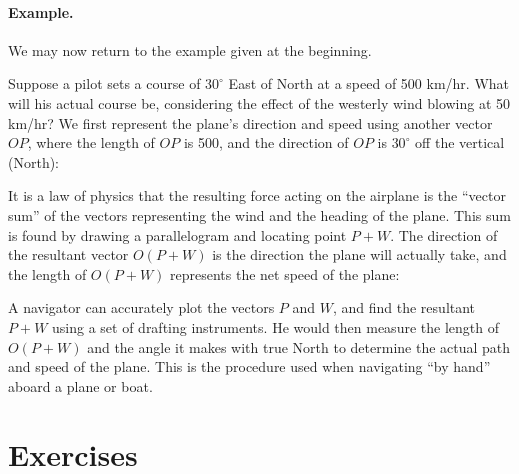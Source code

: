 \documentclass[12pt]{book} %
\begin{document}
\paragraph{Example.}
We may now return to the example given at the beginning.

Suppose a pilot sets a course of $30^\circ$ East of North at a speed of 500 km/hr. What will his actual course be, considering the effect of the westerly wind blowing at 50 km/hr? We first represent the plane's direction and speed using another vector $OP$, where the length of $OP$ is 500, and the direction of $OP$ is $30^\circ$ off the vertical (North):


It is a law of physics that the resulting force acting on the airplane is the ``vector sum'' of the vectors representing the wind and the heading of the plane. This sum is found by drawing a parallelogram and locating point $P+W$. The direction of the resultant vector $O(P+W)$ is the direction the plane will actually take, and the length of $O(P+W)$ represents the net speed of the plane:


A navigator can accurately plot the vectors $P$ and $W$, and find the resultant $P+W$ using a set of drafting instruments. He would then measure the length of $O(P+W)$ and the angle it makes with true North to determine the actual path and speed of the plane. This is the procedure used when navigating ``by hand'' aboard a plane or boat.

\section*{Exercises}
\end{document}
